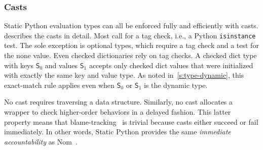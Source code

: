 \documentclass[english,cleveref,submission]{programming}
\newcommand{\SP}{Static Python}
\newcommand{\code}[1]{\texttt{#1}}
\newcommand{\typefont}[1]{\mathsf{#1}}
\newcommand{\spteval}{\typefont{S}}
\begin{document}
\subsubsection{Casts}

\SP{} evaluation types can all be enforced fully and efficiently
with casts.
 describes the casts in detail.
Most call for a tag check, i.e., a Python \code{isinstance} test.
The sole exception is optional types, which require a tag check and a test for the none value.
Even checked dictionaries rely on tag checks.
A checked dict type with keys $\spteval_0$ and values $\spteval_1$ accepts only
checked dict values that were initialized with exactly the same key and value type.
As noted in~\cref{s:type-dynamic}, this exact-match rule applies even when $\spteval_0$
or $\spteval_1$ is the dynamic type.

No cast requires traversing a data structure.
Similarly, no cast allocates a wrapper to check higher-order behaviors in a delayed fashion.
This latter property means that blame-tracking~\cite{ff-icfp-2002} is trivial because
casts either succeed or fail immediately.
In other words, \SP{} provides the same \emph{immediate accountability} as
Nom~\cite{mt-oopsla-2017}.

\end{document}

